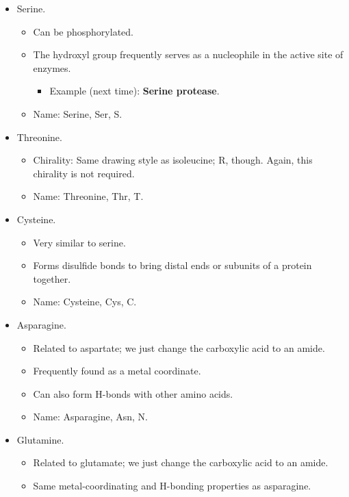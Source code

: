 \documentclass[../notes.tex]{subfiles}
\begin{document}
\begin{itemize}
\begin{itemize}
        \item Serine.
        \begin{itemize}
            \item Can be phosphorylated.
            \item The hydroxyl group frequently serves as a nucleophile in the active site of enzymes.
            \begin{itemize}
                \item Example (next time): \textbf{Serine protease}.
            \end{itemize}
            \item Name: Serine, Ser, S.
        \end{itemize}
        \item Threonine.
        \begin{itemize}
            \item Chirality: Same drawing style as isoleucine; R, though. Again, this chirality is not required.
            \item Name: Threonine, Thr, T.
        \end{itemize}
        \item Cysteine.
        \begin{itemize}
            \item Very similar to serine.
            \item Forms disulfide bonds to bring distal ends or subunits of a protein together.
            \item Name: Cysteine, Cys, C.
        \end{itemize}
        \item Asparagine.
        \begin{itemize}
            \item Related to aspartate; we just change the carboxylic acid to an amide.
            \item Frequently found as a metal coordinate.
            \item Can also form H-bonds with other amino acids.
            \item Name: Asparagine, Asn, N.
        \end{itemize}
        \item Glutamine.
        \begin{itemize}
            \item Related to glutamate; we just change the carboxylic acid to an amide.
            \item Same metal-coordinating and H-bonding properties as asparagine.

\end{itemize}
\end{itemize}
\end{itemize}
\end{document}
